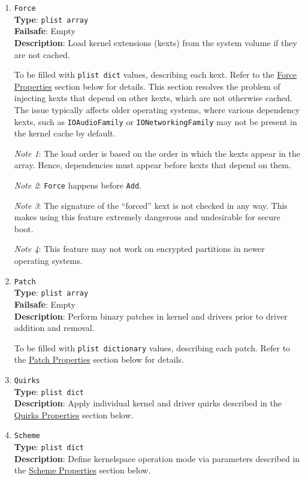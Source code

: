 \documentclass[]{article}
\begin{document}
\begin{enumerate}
\item
  \texttt{Force}\\
  \textbf{Type}: \texttt{plist\ array}\\
  \textbf{Failsafe}: Empty\\
  \textbf{Description}: Load kernel extensions (kexts) from the system volume if they are not cached.

  To be filled with \texttt{plist\ dict} values, describing each kext.
  Refer to the \hyperref[kernelpropsforce]{Force Properties} section below for details.
  This section resolves the problem of injecting kexts that depend on other
  kexts, which are not otherwise cached. The issue typically affects older
  operating systems, where various dependency kexts, such as \texttt{IOAudioFamily}
  or \texttt{IONetworkingFamily} may not be present in the kernel cache by default.

  \emph{Note 1}: The load order is based on the order in which the kexts appear in
  the array. Hence, dependencies must appear before kexts that depend on them.

  \emph{Note 2}: \texttt{Force} happens before \texttt{Add}.

  \emph{Note 3}: The signature of the ``forced'' kext is not checked in any way.
  This makes using this feature extremely dangerous and undesirable for secure boot.

  \emph{Note 4}: This feature may not work on encrypted partitions in newer operating systems.

\item
  \texttt{Patch}\\
  \textbf{Type}: \texttt{plist\ array}\\
  \textbf{Failsafe}: Empty\\
  \textbf{Description}: Perform binary patches in kernel and drivers prior to
  driver addition and removal.

  To be filled with \texttt{plist\ dictionary} values, describing each patch.
  Refer to the \hyperref[kernelpropspatch]{Patch Properties} section below for details.

\item
  \texttt{Quirks}\\
  \textbf{Type}: \texttt{plist\ dict}\\
  \textbf{Description}: Apply individual kernel and driver quirks described
  in the \hyperref[kernelpropsquirks]{Quirks Properties} section below.

\item
  \texttt{Scheme}\\
  \textbf{Type}: \texttt{plist\ dict}\\
  \textbf{Description}: Define kernelspace operation mode via parameters
  described in the \hyperref[kernelpropsscheme]{Scheme Properties} section below.


\end{enumerate}
\end{document}
